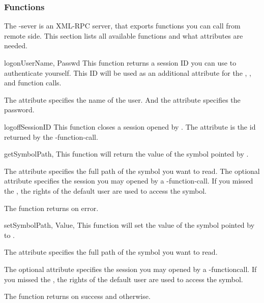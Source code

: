 \subsubsection{Functions}
The -sever is an XML-RPC server, that exports 
functions you can call from remote side. This section lists all available 
functions and what attributes are needed. 

\begin{funcdescni}{logon}{UserName, Passwd}
This function returns a session ID you can use to authenticate yourself. This 
ID will be used as an additional attribute for the , 
 ,  and 
 function calls.

The attribute  specifies the name of the user. And
the attribute  specifies the password.
\end{funcdescni}


\begin{funcdescni}{logoff}{SessionID}
This function closes a session opened by .
The attribute  is the id returned by the
-function-call.
\end{funcdescni}


\begin{funcdescni}{get}{SymbolPath,}
This function will return the value of the symbol pointed by .

The attribute  specifies the full path of the symbol you want 
to read.
The optional attribute  specifies the session you may opened by 
a -function-call. If you missed the , the 
rights of the default user are used to access the symbol. 

The function returns  on error.
\end{funcdescni}


\begin{funcdescni}{set}{SymbolPath, Value, }
This function will set the value of the symbol pointed by  to 
.

The attribute  specifies the full path of the symbol you want 
to read.

The optional attribute  specifies the session you may opened by 
a -functioncall. If you missed the , the 
rights of the default user are used to access the symbol. 

The function returns  on success and  otherwise.
\end{funcdescni}


